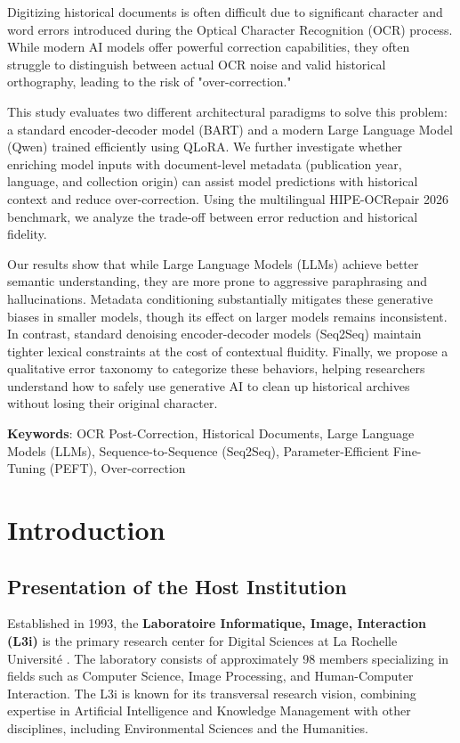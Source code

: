 \documentclass[11pt]{extarticle}
\begin{document}
Digitizing historical documents is often difficult due to significant character and word errors introduced during the Optical Character Recognition (OCR) process. While modern AI models offer powerful correction capabilities, they often struggle to distinguish between actual OCR noise and valid historical orthography, leading to the risk of "over-correction."

This study evaluates two different architectural paradigms to solve this problem: a standard encoder-decoder model (BART) and a modern Large Language Model (Qwen) trained efficiently using QLoRA. We further investigate whether enriching model inputs with document-level metadata (publication year, language, and collection origin) can assist model predictions with historical context and reduce over-correction. 
Using the multilingual HIPE-OCRepair 2026 benchmark, we analyze the trade-off between error reduction and historical fidelity.

Our results show that while Large Language Models (LLMs) achieve better semantic understanding, they are more prone to aggressive paraphrasing and hallucinations. Metadata conditioning substantially mitigates these generative biases in smaller models, though its effect on larger models remains inconsistent. In contrast, standard denoising encoder-decoder models (Seq2Seq) maintain tighter lexical constraints at the cost of contextual fluidity. Finally, we propose a qualitative error taxonomy to categorize these behaviors, helping researchers understand how to safely use generative AI to clean up historical archives without losing their original character.

\textbf{Keywords}: OCR Post-Correction, Historical Documents, Large Language Models (LLMs), Sequence-to-Sequence (Seq2Seq), Parameter-Efficient Fine-Tuning (PEFT), Over-correction

\newpage

\section{Introduction}
\subsection{Presentation of the Host Institution}
Established in 1993, the \textbf{Laboratoire Informatique, Image, Interaction (L3i)} is the primary research center for Digital Sciences at La Rochelle Université \cite{l3i_website}. The laboratory consists of approximately 98 members specializing in fields such as Computer Science, Image Processing, and Human-Computer Interaction. The L3i is known for its transversal research vision, combining expertise in Artificial Intelligence and Knowledge Management with other disciplines, including Environmental Sciences and the Humanities.
\end{document}
